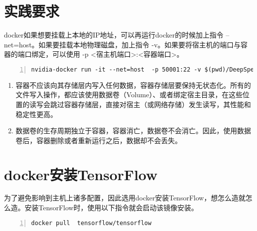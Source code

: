 \section{实践要求}
docker如果想要挂载上本地的IP地址，可以再运行docker的时候加上指令 --net=host。如果要挂载本地物理磁盘，加上指令 -v。如果要将宿主机的端口与容器的端口绑定，可以使用 -p <宿主机端口>:<容器端口>。
\begin{lstlisting}[language = shell, numbers=left, 
         numberstyle=\tiny,keywordstyle=\color{blue!70},
         commentstyle=\color{red!50!green!50!blue!50},frame=shadowbox,
         rulesepcolor=\color{red!20!green!20!blue!20},basicstyle=\ttfamily]
nvidia-docker run -it --net=host  -p 50001:22 -v $(pwd)/DeepSpeech:/DeepSpeech  -v /data1/asr_data:/mnt/data -v /data/kaldi/2019_0521_kaldi/kaldi-master:/mnt/kaldi duhu/ds-server /bin/bash
\end{lstlisting}

\begin{enumerate}
  \item 容器不应该向其存储层内写入任何数据，容器存储层要保持无状态化。所有的文件写入操作，都应该使用数据卷（Volume）、或者绑定宿主目录，在这些位置的读写会跳过容器存储层，直接对宿主（或网络存储）发生读写，其性能和稳定性更高。
  \item 数据卷的生存周期独立于容器，容器消亡，数据卷不会消亡。因此，使用数据卷后，容器删除或者重新运行之后，数据却不会丢失。
\end{enumerate}

\section{docker安装TensorFlow}
为了避免影响到主机上诸多配置，因此选用docker安装TensorFlow，想怎么造就怎么造。安装TensorFlow时，使用以下指令就会启动该镜像安装。
\begin{lstlisting}[language = shell, numbers=left, 
         numberstyle=\tiny,keywordstyle=\color{blue!70},
         commentstyle=\color{red!50!green!50!blue!50},frame=shadowbox,
         rulesepcolor=\color{red!20!green!20!blue!20},basicstyle=\ttfamily]
docker pull  tensorflow/tensorflow
\end{lstlisting}